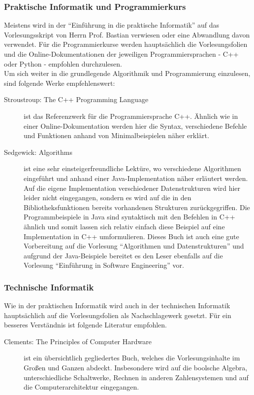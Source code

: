 \subsubsection*{Praktische Informatik und Programmierkurs}
Meistens wird in der \enquote{Einführung in die praktische Informatik}
auf das Vorlesungsskript von Herrn Prof. Bastian verwiesen oder
eine Abwandlung davon verwendet. Für die Programmierkurse 
werden hauptsächlich die Vorlesungsfolien und die Online-Dokumentationen
der jeweiligen Programmiersprachen - C++ oder Python - empfohlen durchzulesen.
\\
Um sich weiter in die grundlegende Algorithmik und Programmierung einzulesen,
sind folgende Werke empfehlenswert:
\begin{description}
	\item[Stroustroup: The C++ Programming Language] ist das Referenzwerk für
	die Programmiersprache C++. Ähnlich wie in einer Online-Dokumentation werden
	hier die Syntax, verschiedene Befehle und Funktionen anhand von Minimalbeispielen
	näher erklärt.
	\item[Sedgewick: Algorithms] ist eine sehr einsteigerfreundliche Lektüre, wo 
	verschiedene Algorithmen eingeführt und anhand einer Java-Implementation
	näher erläutert werden. Auf die eigene Implementation verschiedener Datenstrukturen
	wird hier leider nicht eingegangen, sondern es wird auf die in den Bibliotheksfunktionen
	bereits vorhandenen Strukturen zurückgegriffen.
	Die Programmbeispiele in Java sind syntaktisch   	mit den Befehlen in C++ ähnlich und somit lassen
	sich relativ einfach diese Beispiel auf
	eine Implementation in C++ umformulieren.
	Dieses Buch ist auch eine gute Vorbereitung auf die Vorlesung \enquote{Algorithmen und Datenstrukturen}
	und aufgrund der Java-Beispiele bereitet es den Leser ebenfalls auf die Vorlesung \enquote{Einführung in Software Engineering} vor. 
\end{description}

\subsubsection*{Technische Informatik}
Wie in der praktischen Informatik wird auch in der technischen Informatik
hauptsächlich auf die Vorlesungsfolien als Nachschlagewerk gesetzt.
Für ein besseres Verständnis ist folgende Literatur empfohlen.
\begin{description}
	\item[Clements: The Principles of Computer Hardware] ist ein übersichtlich gegliedertes
	Buch, welches die Vorlesungsinhalte im Großen und Ganzen abdeckt.
	Insbesondere wird auf die boolsche Algebra, unterschiedliche Schaltwerke,
	Rechnen in anderen Zahlensystemen und auf die Computerarchitektur
	eingegangen. 
\end{description}

